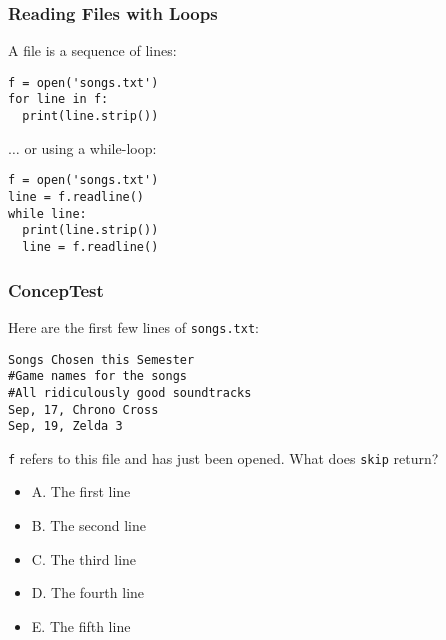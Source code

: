 \documentclass{beamer}
\begin{document}
\begin{frame}[fragile]
\frametitle{Reading Files with Loops}
A file is a sequence of lines:
\begin{small}
\begin{verbatim}
f = open('songs.txt')
for line in f:
  print(line.strip())
\end{verbatim}
\end{small}

$\ldots$ or using a while-loop:
\begin{small}
\begin{verbatim}
f = open('songs.txt')
line = f.readline()
while line:
  print(line.strip())
  line = f.readline()
\end{verbatim}
\end{small}
\end{frame}

\begin{frame}[fragile]
\frametitle{ConcepTest}
Here are the first few lines of \verb|songs.txt|:
\begin{small}
\begin{verbatim}
Songs Chosen this Semester
#Game names for the songs
#All ridiculously good soundtracks
Sep, 17, Chrono Cross
Sep, 19, Zelda 3
\end{verbatim}
\end{small}

\begin{scriptsize}

\end{scriptsize}

\verb|f| refers to this file and has just been opened. What does \verb|skip| return?
\begin{itemize}
\item A. The first line
\item B. The second line
\item C. The third line
\item D. The fourth line
\item E. The fifth line
\end{itemize}
\end{frame}
\end{document}
